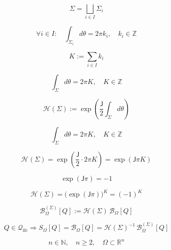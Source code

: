 \documentclass[12pt]{article}
\begin{document}
\begin{equation}
\Sigma=\bigsqcup_{i\in I}\Sigma_i
\end{equation}

\begin{equation}
\forall i\in I:\quad \int_{\Sigma_i}d\theta=2\pi k_i,\quad k_i\in\mathbb{Z}
\end{equation}

\begin{equation}
K:=\sum_{i\in I}k_i
\end{equation}

\begin{equation}
\int_\Sigma d\theta=2\pi K,\quad K\in\mathbb{Z}
\end{equation}

\begin{equation}
\mathcal{H}(\Sigma):=\exp\!\left(\frac{\mathsf{J}}{2}\int_\Sigma d\theta\right)
\end{equation}

\begin{equation}
\int_\Sigma d\theta=2\pi K,\quad K\in\mathbb{Z}
\end{equation}

\begin{equation}
\mathcal{H}(\Sigma)
=\exp\!\left(\frac{\mathsf{J}}{2}\cdot 2\pi K\right)
=\exp(\mathsf{J}\pi K)
\end{equation}

\begin{equation}
\exp(\mathsf{J}\pi)=-1
\end{equation}

\begin{equation}
\mathcal{H}(\Sigma)
=\bigl(\exp(\mathsf{J}\pi)\bigr)^K
=(-1)^K
\end{equation}

\begin{equation}
\mathcal{B}_{\Omega}^{(\Sigma)}[Q]
:=\mathcal{H}(\Sigma)\,\mathcal{B}_{\Omega}[Q]
\end{equation}

\begin{equation}
Q\in\mathcal{Q}_{\mathrm{ifc}}\Longrightarrow
S_{\Omega}[Q]=\mathcal{B}_{\Omega}[Q]
=\mathcal{H}(\Sigma)^{-1}\,\mathcal{B}_{\Omega}^{(\Sigma)}[Q]
\end{equation}

\begin{equation}
n\in\mathbb{N},\quad n\ge 2,\quad \Omega\subset\mathbb{R}^n
\end{equation}
\end{document}
